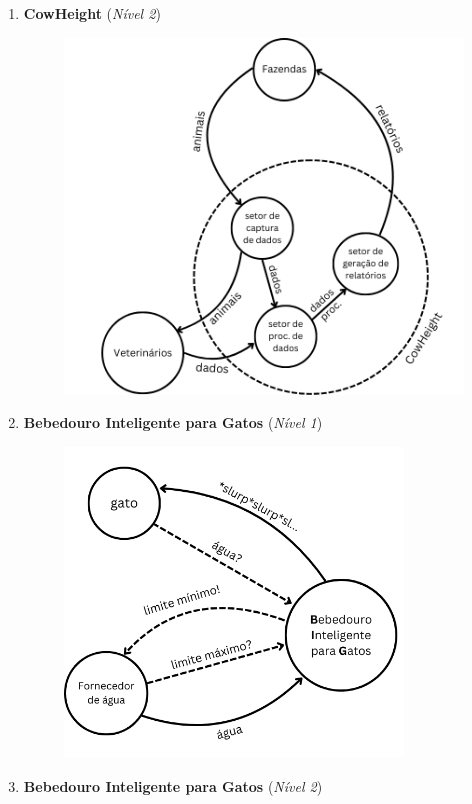 \documentclass{article}
\begin{document}
\begin{enumerate}
\begin{figure}[!h]
    \end{figure}
    \item \textbf{CowHeight} (\textit{Nível 2})
    \begin{figure}[!h]
        \centering
        \includegraphics[width=11cm]{FIG/cowheight2.png}
    \end{figure}
    \item \textbf{Bebedouro Inteligente para Gatos} (\textit{Nível 1})
    \begin{figure}[!h]
        \centering
        \includegraphics[width=9cm]{FIG/bebedouro1.png}
    \end{figure}
    \pagebreak
    \item \textbf{Bebedouro Inteligente para Gatos} (\textit{Nível 2})
    \begin{figure}[!h]
        \centering

\end{figure}
\end{enumerate}
\end{document}
